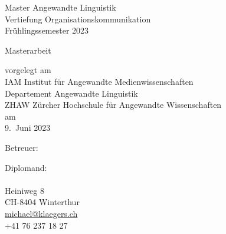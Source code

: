 \begin{titlepage}
{Master Angewandte Linguistik \\
Vertiefung Organisationskommunikation \\
Frühlingssemester 2023 \par}

\vspace{0.6cm}
Masterarbeit \par
\vspace{1.2cm}
{\large \bfseries \ttitle}
\vspace{1.8cm}

{vorgelegt am\\
IAM Institut für Angewandte Medienwissenschaften\\
Departement Angewandte Linguistik\\
ZHAW Zürcher Hochschule für Angewandte Wissenschaften\\
am\\
9.~Juni 2023}

\vfill
{Betreuer: \supnameA 
\par}
\vfill
{Diplomand:\\
\authorname\\
Heiniweg 8\\
CH-8404 Winterthur\\
\href{mailto:michael@klaegers.ch}{michael@klaegers.ch}\\
+41 76 237 18 27}
\end{titlepage}
\restoregeometry

